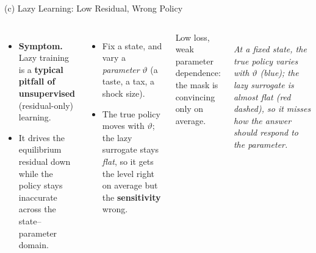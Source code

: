 \documentclass[aspectratio=169,11pt]{beamer}
\newcommand{\lemph}[1]{{\color{uzhblue}\bfseries #1}}
\newcommand{\visualcaption}[1]{{\scriptsize\color{stone}\itshape #1}}
\newcommand{\param}{{\bm{\theta}}}
\begin{document}
\begin{frame}[shrink=5]{(c) Lazy Learning: Low Residual, Wrong Policy}
\begin{columns}[T,onlytextwidth]
{\footnotesize
\begin{itemize}\setlength\itemsep{2pt}
  \item \textbf{\color{uzhblue}Symptom.} Lazy training is a \lemph{typical pitfall
        of unsupervised} (residual-only) learning.
  \item It drives the equilibrium residual down while the policy stays inaccurate
        across the state--parameter domain.
\end{itemize}}
\vspace{0.3em}
\begin{itemize}\setlength\itemsep{3pt}\footnotesize
  \item Fix a state, and vary a \emph{parameter} $\vartheta$ (a taste, a tax, a
        shock size).
  \item The true policy moves with $\vartheta$; the lazy surrogate stays
        \emph{flat}, so it gets the level right on average but the
        \lemph{sensitivity} wrong.
\end{itemize}
\begin{pitfall}
\footnotesize Low loss, weak parameter dependence: the mask is convincing only
on average.
\end{pitfall}
\centering
{}\\[1pt]
\visualcaption{At a fixed state, the true policy varies with $\vartheta$ (blue);
the lazy surrogate is almost flat (red dashed), so it misses how the answer
should respond to the parameter.}
\end{columns}
\end{frame}
\end{document}

